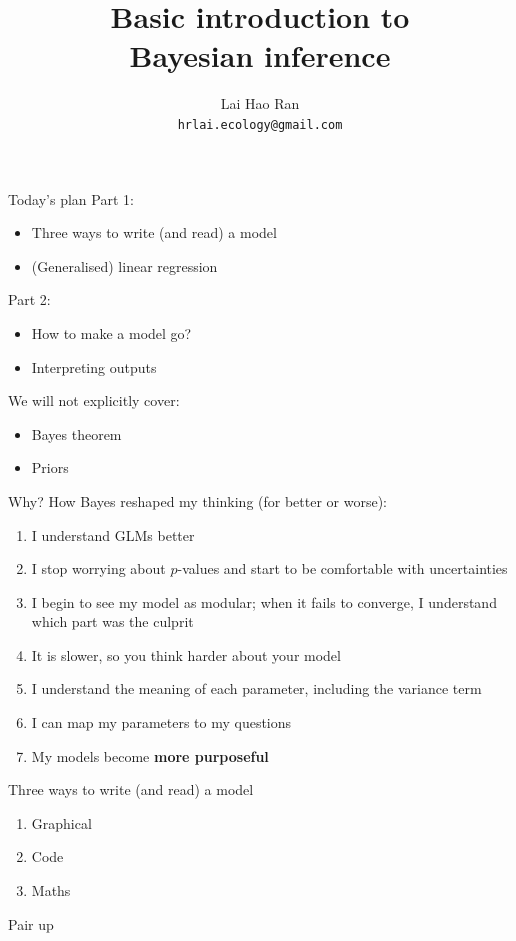 \documentclass[12pt]{beamer}
\author{Lai Hao Ran \\ \footnotesize\texttt{hrlai.ecology@gmail.com}}
\title{Basic introduction to\\Bayesian inference}
\date{}
\begin{document}
\begin{frame}
\titlepage
\end{frame}

\begin{frame}{Today's plan}
Part 1:
\begin{itemize}
\item Three ways to write (and read) a model
\item (Generalised) linear regression
\end{itemize}

Part 2:
\begin{itemize}
\item How to make a model go?
\item Interpreting outputs
\end{itemize}
\vfill
We will not explicitly cover:
\begin{itemize}
\item Bayes theorem 
\item Priors
\end{itemize}
\end{frame}

\begin{frame}{Why?}
How Bayes reshaped my thinking (for better or worse):
\begin{enumerate}
\item I understand GLMs better
\item I stop worrying about $p$-values and start to be comfortable with uncertainties
\item I begin to see my model as modular; when it fails to converge, I understand which part was the culprit
\item It is slower, so you think harder about your model
\item I understand the meaning of each parameter, including the variance term
\item I can map my parameters to my questions
\item My models become \textbf{more purposeful}
\end{enumerate}
\end{frame}

\begin{frame}{Three ways to write (and read) a model}
\begin{enumerate}
\item Graphical
\item Code
\item Maths
\end{enumerate}
\vfill
Pair up
\end{frame}
\end{document}
